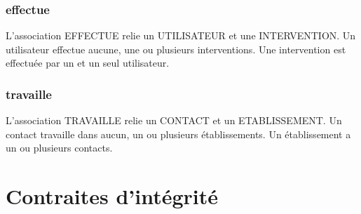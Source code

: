 \documentclass[asi, sansVersion]{picInsa}
\begin{document}
\subsection*{effectue} 

L'association EFFECTUE relie un UTILISATEUR et une INTERVENTION. Un utilisateur effectue aucune, une ou plusieurs interventions. Une intervention est effectuée par un et un seul utilisateur. 

\subsection*{travaille}

L'association TRAVAILLE relie un CONTACT et un ETABLISSEMENT. Un contact travaille dans aucun, un ou plusieurs établissements. Un établissement a un ou plusieurs contacts.   

\chapter{Contraites d'intégrité}
\end{document}
